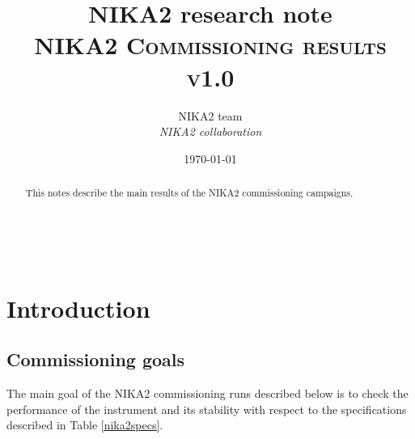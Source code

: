 \documentclass[a4paper, 11pt]{article} %
\title{\textbf{NIKA2 research note}\\   
\textsc{NIKA2 Commissioning results v1.0}} %
\author{NIKA2 team %
\\{\textit{NIKA2 collaboration}}} %
\date{\today} %
\makeatletter
\renewcommand{\maketitle}{ %
\begin{flushleft} %
{\LARGE\@title} %

\vspace{50pt} %

{\large\@author} %
\\\@date %

\vspace{40pt} %
\end{flushleft}
}
\makeatother
\begin{document}
\maketitle %
\tableofcontents


\begin{abstract}
This notes describe the main results of the NIKA2 commissioning campaigns.
\end{abstract}


\vspace{30pt} %

%
%


\section{Introduction}

\subsection{Commissioning goals}
The main goal of the NIKA2 commissioning runs described below is to check the performance of the instrument and its stability with respect to the specifications described in Table \ref{nika2specs}.

\end{document}
